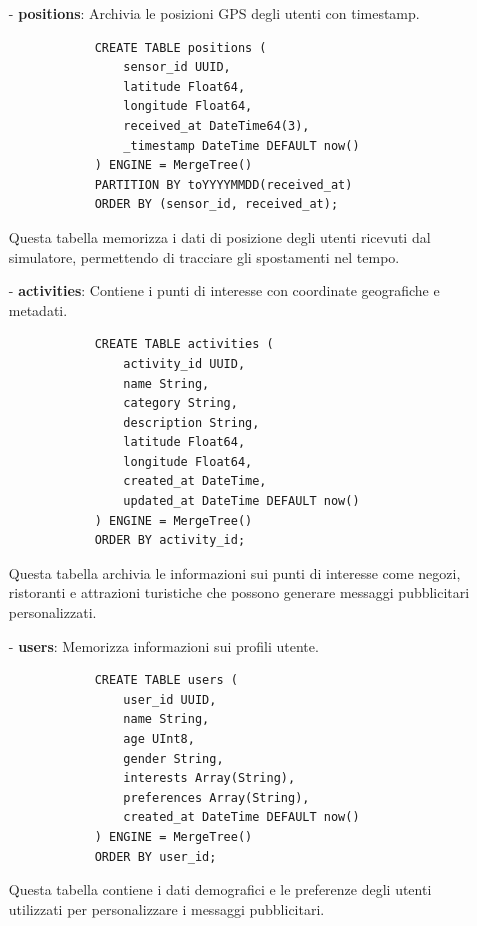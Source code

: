 \documentclass[10pt]{article}
\begin{document}
        \begin{itemize}
            \item[-] \textbf{positions}: Archivia le posizioni GPS degli utenti con timestamp.
            \begin{lstlisting}
            CREATE TABLE positions (
                sensor_id UUID,
                latitude Float64,
                longitude Float64,
                received_at DateTime64(3),
                _timestamp DateTime DEFAULT now()
            ) ENGINE = MergeTree()
            PARTITION BY toYYYYMMDD(received_at)
            ORDER BY (sensor_id, received_at);
            \end{lstlisting}
            Questa tabella memorizza i dati di posizione degli utenti ricevuti dal simulatore, permettendo di tracciare gli spostamenti nel tempo.

            \item[-] \textbf{activities}: Contiene i punti di interesse con coordinate geografiche e metadati.
            \begin{lstlisting}
            CREATE TABLE activities (
                activity_id UUID,
                name String,
                category String,
                description String,
                latitude Float64,
                longitude Float64,
                created_at DateTime,
                updated_at DateTime DEFAULT now()
            ) ENGINE = MergeTree()
            ORDER BY activity_id;
            \end{lstlisting}
            Questa tabella archivia le informazioni sui punti di interesse come negozi, ristoranti e attrazioni turistiche che possono generare messaggi pubblicitari personalizzati.

            \item[-] \textbf{users}: Memorizza informazioni sui profili utente.
            \begin{lstlisting}
            CREATE TABLE users (
                user_id UUID,
                name String,
                age UInt8,
                gender String,
                interests Array(String),
                preferences Array(String),
                created_at DateTime DEFAULT now()
            ) ENGINE = MergeTree()
            ORDER BY user_id;
            \end{lstlisting}
            Questa tabella contiene i dati demografici e le preferenze degli utenti utilizzati per personalizzare i messaggi pubblicitari.


\end{itemize}
\end{document}
